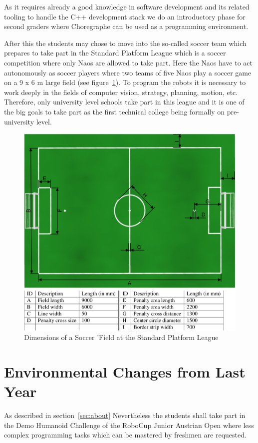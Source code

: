 \documentclass[11pt]{article}
\begin{document}
As it requires already a good knowledge in software development and its related tooling to handle the C++ development stack we do an introductory phase for second graders where Choregraphe can be used as a programming environment.

After this the students may chose to move into the so-called soccer team which prepares to take part in the Standard Platform League which is a soccer competition where only Naos are allowed to take part. Here the Naos have to act autonomously as soccer players where two teams of five Naos play a soccer game on a 9 x 6 m large field (see figure~\ref{fig:soccerField}). To program the robots it is necessary to work deeply in the fields of computer vision, strategy, planning, motion, etc. Therefore, only university level schools take part in this league and it is one of the big goals to take part as the first technical college being formally on pre-university level.

\begin{figure}
\begin{center}
\includegraphics[scale=0.38]{img/soccerField.png}
\end{center}
\caption{Dimensions of a Soccer 'Field at the Standard Platform League}
\label{fig:soccerField}
\end{figure}

\section{Environmental Changes from Last Year}
As described in section~\ref{sec:about} Nevertheless the students shall take part in the Demo Humanoid Challenge of the RoboCup Junior Austrian Open where less complex programming tasks which can be mastered by freshmen are requested.
\end{document}
